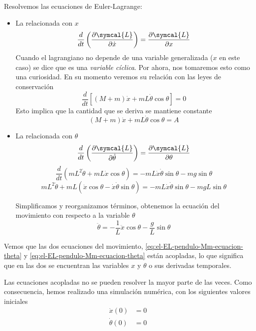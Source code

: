 Resolvemos las ecuaciones de Euler-Lagrange:
\begin{itemize}
\item La relacionada con $x$
  \[
    \frac{d}{dt}\left(\frac{\partial\symcal{L}}{\partial\dot{x}}\right)
    = \frac{\partial\symcal{L}}{\partial x}
  \]
  Cuando el lagrangiano no depende de una variable generalizada ($x$ en este caso)
  se dice que es una \emph{variable cíclica}.
  Por ahora, nos tomaremos esto como una curiosidad. En su momento veremos su relación
  con las leyes de conservación
  \[
    \frac{d}{dt}\left[(M+m)\dot{x}+mL\dot{\theta}\cos\theta\right] = 0
  \]
  Esto implica que la cantidad que se deriva se mantiene constante
  \begin{equation}\label{eq:el-EL-pendulo-Mm-ecuacion-x}
    (M+m)\dot{x}+mL\dot{\theta}\cos\theta = A
  \end{equation}
  
\item La relacionada con $\theta$
  \[
    \frac{d}{dt}\left(\frac{\partial\symcal{L}}{\partial\dot{\theta}}\right)
    = \frac{\partial\symcal{L}}{\partial\theta}
  \]
  \[
    \frac{d}{dt}\left(mL^2\dot{\theta} + mL\dot{x}\cos\theta\right)
    = -mL\dot{x}\dot{\theta}\sin\theta-mg\sin\theta
  \]
  \[
    mL^2\ddot{\theta} + mL\left(\ddot{x}\cos\theta - \dot{x}\dot{\theta}\sin\theta\right)
    = -mL\dot{x}\dot{\theta}\sin\theta-mgL\sin\theta
  \]

  Simplificamos y reorganizamos términos, obtenemos la ecuación del movimiento con respecto a la
  variable $\theta$
  \begin{equation}\label{eq:el-EL-pendulo-Mm-ecuacion-theta}
    \ddot{\theta} = -\frac{1}{L}\ddot{x}\cos\theta - \frac{g}{L}\sin\theta
  \end{equation}
\end{itemize}

Vemos que las dos ecuaciones del movimiento, \ref{eq:el-EL-pendulo-Mm-ecuacion-theta}
y \ref{eq:el-EL-pendulo-Mm-ecuacion-theta} están acopladas, lo que significa que en
las dos se encuentran las variables $x$ y $\theta$ o sus derivadas temporales.

Las ecuaciones acopladas no se pueden resolver la mayor parte de las veces.
Como consecuencia, hemos realizado una simulación numérica, con los siguientes
valores iniciales
\begin{align*}
  \dot{x}(0) &= 0\\
  \dot{\theta}(0) &= 0
\end{align*}













